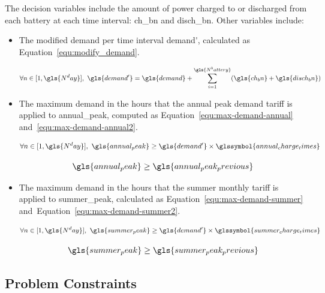 The decision variables include the amount of power charged to or discharged from each battery at each time interval: \gls{ch_bn} and \gls{disch_bn}.
Other variables include:
\begin{itemize}
	\item The modified demand per time interval \gls{demand'}, calculated as Equation~\ref{equ:modify_demand}.
	
	\begin{equation}
		\label{equ:modify_demand}
		\forall n \in [1, \gls{N^day}], ~ \gls{demand'} = \gls{demand} +\sum_{i=1}^{\gls{N^battery}} ( \gls{ch_bn} + \gls{disch_bn} )
	\end{equation}
	
	\item The maximum demand in the hours that the annual peak demand tariff is applied to \gls{annual_peak},  computed as Equation~\ref{equ:max-demand-annual} and~\ref{equ:max-demand-annual2}.
	
	\begin{equation}
		\label{equ:max-demand-annual}
		\forall n \in [1, \gls{N^day}], ~ \gls{annual_peak} \geq \gls{demand'} \times \glssymbol{annual_charge_times}
	\end{equation}
	
	\begin{equation}
		\label{equ:max-demand-annual2}
		\gls{annual_peak} \geq \gls{annual_peak_previous}
	\end{equation}
	
	\item The maximum demand in the hours that the summer monthly tariff is applied to \gls{summer_peak}, calculated as Equation~\ref{equ:max-demand-summer} and~Equation~\ref{equ:max-demand-summer2}.
	
	\begin{equation}
		\label{equ:max-demand-summer}
		\forall n \in [1, \gls{N^day}], ~ \gls{summer_peak} \geq \gls{demand'} \times \glssymbol{summer_charge_times}
	\end{equation}
	
	\begin{equation}
		\label{equ:max-demand-summer2}
		\gls{summer_peak} \geq \gls{summer_peak_previous}
	\end{equation}
	
\end{itemize}


\subsection{Problem Constraints}
\label{pdm:problem:contraints}

